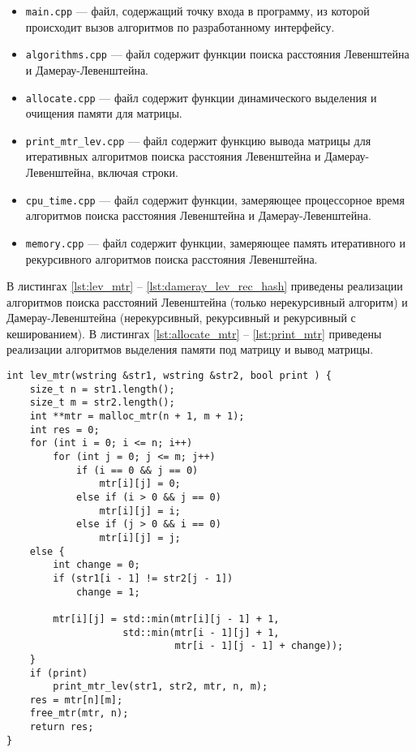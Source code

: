 \begin{itemize}
	\item \texttt{main.cpp} --- файл, содержащий точку входа в программу, из которой происходит вызов алгоритмов по разработанному интерфейсу.
	\item \texttt{algorithms.cpp} --- файл содержит функции поиска расстояния Левенштейна и Дамерау-Левенштейна.
	\item \texttt{allocate.cpp} --- файл содержит функции динамического выделения и очищения памяти для матрицы.
	\item \texttt{print\_mtr\_lev.cpp} --- файл содержит функцию вывода матрицы для итеративных алгоритмов поиска расстояния Левенштейна и Дамерау-Левенштейна, включая строки.
	\item \texttt{cpu\_time.cpp} --- файл содержит функции, замеряющее процессорное время алгоритмов поиска расстояния Левенштейна и \newline Дамерау-Левенштейна.
	\item \texttt{memory.cpp} --- файл содержит функции, замеряющее память итеративного и рекурсивного алгоритмов поиска расстояния Левенштейна.
\end{itemize}


В листингах \ref{lst:lev_mtr} -- \ref{lst:dameray_lev_rec_hash} приведены реализации алгоритмов поиска расстояний Левенштейна (только нерекурсивный алгоритм) и Дамерау-Левенштейна (нерекурсивный, рекурсивный и рекурсивный с кешированием).
В листингах \ref{lst:allocate_mtr} -- \ref{lst:print_mtr} приведены реализации алгоритмов выделения памяти под матрицу и вывод матрицы.

\clearpage

\begin{lstlisting}[label=lst:lev_mtr,caption=Функция нахождения расстояния Левенштейна с использованием матрицы]
int lev_mtr(wstring &str1, wstring &str2, bool print ) {
	size_t n = str1.length();
	size_t m = str2.length();
	int **mtr = malloc_mtr(n + 1, m + 1);
	int res = 0;
	for (int i = 0; i <= n; i++)
		for (int j = 0; j <= m; j++)
			if (i == 0 && j == 0)
				mtr[i][j] = 0;
			else if (i > 0 && j == 0)
				mtr[i][j] = i;
			else if (j > 0 && i == 0)
				mtr[i][j] = j;
	else {
		int change = 0;
		if (str1[i - 1] != str2[j - 1])
			change = 1;
		
		mtr[i][j] = std::min(mtr[i][j - 1] + 1,
					std::min(mtr[i - 1][j] + 1,
							 mtr[i - 1][j - 1] + change));
	}
	if (print)
		print_mtr_lev(str1, str2, mtr, n, m);
	res = mtr[n][m];
	free_mtr(mtr, n);
	return res;
}
\end{lstlisting}

